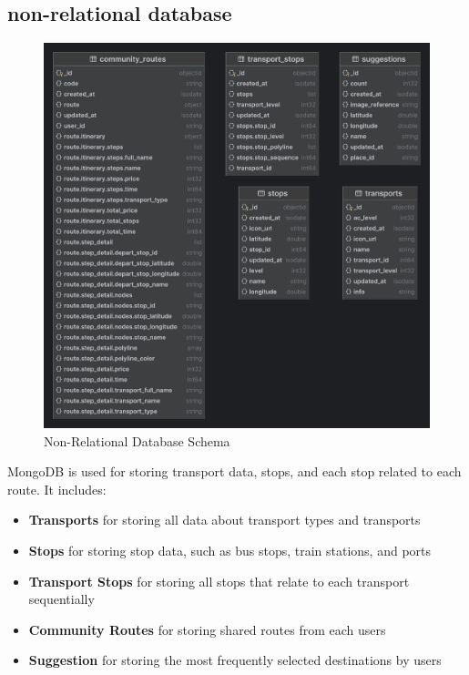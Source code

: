 \subsection{non-relational database}
\begin{figure}[!h]
    \centering
    \includegraphics[width=0.6\linewidth]{chapter3/nosql-db-schema.png}
    \caption{Non-Relational Database Schema}
    \label{fig:Non-Relational Database Schema}
\end{figure}
MongoDB is used for storing transport data, stops, and each stop related to each route. It includes:
\begin{itemize}
	\item \textbf{Transports} for storing all data about transport types and transports
	\item \textbf{Stops} for storing stop data, such as bus stops, train stations, and ports
	\item \textbf{Transport Stops} for storing all stops that relate to each transport sequentially
	\item \textbf{Community Routes} for storing shared routes from each users
	\item \textbf{Suggestion} for storing the most frequently selected destinations by users
\end{itemize}

\newpage
